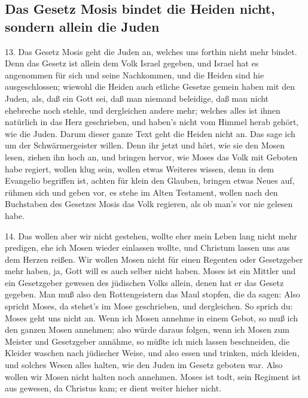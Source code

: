 \subsection[Das Gesetz Mosis bindet die Heiden nicht, sondern]{Das Gesetz Mosis bindet die Heiden nicht, sondern allein die Juden}

13. Das Gesetz Mosis geht die Juden an, welches uns forthin nicht mehr bindet. Denn das Gesetz ist allein dem Volk Israel gegeben, und Israel hat es angenommen für sich und seine Nachkommen, und die Heiden sind hie ausgeschlossen; wiewohl die Heiden auch etliche Gesetze gemein haben mit den Juden, als, daß ein Gott sei, daß man niemand beleidige, daß man nicht ehebreche noch stehle, und dergleichen andere mehr; welches alles ist ihnen natürlich in das Herz geschrieben, und haben’s nicht vom Himmel herab gehört, wie die Juden. Darum dieser ganze Text geht die Heiden nicht an. Das sage ich um der Schwärmergeister willen. Denn ihr jetzt und hört, wie sie den Mosen lesen, ziehen ihn hoch an, und bringen hervor, wie Moses das Volk mit Geboten habe regiert, wollen klug sein, wollen etwas Weiteres wissen, denn in dem Evangelio begriffen ist, achten für klein den Glauben, bringen etwas Neues auf, rühmen sich und geben vor, es stehe im Alten Testament, wollen nach den Buchstaben des Gesetzes Mosis das Volk regieren, als ob man’s vor nie gelesen habe.

14. Das wollen aber wir nicht gestehen, wollte eher mein Leben lang nicht mehr predigen, ehe ich Mosen wieder einlassen wollte, und Christum lassen uns aus dem Herzen reißen. Wir wollen Mosen nicht für einen Regenten oder Gesetzgeber mehr haben, ja, Gott will es auch selber nicht haben. Moses ist ein Mittler und ein Gesetzgeber gewesen des jüdischen Volks allein, denen hat er das Gesetz gegeben. Man muß also den Rottengeistern das Maul stopfen, die da sagen: Also spricht Moses, da stehet’s im Mose geschrieben, und dergleichen. So sprich du: Moses geht uns nicht an. Wenn ich Mosen annehme in einem Gebot, so muß ich den ganzen Mosen annehmen; also würde daraus folgen, wenn ich Mosen zum Meister und Gesetzgeber annähme, so müßte ich mich lassen beschneiden, die Kleider waschen nach jüdischer Weise, und also essen und trinken, mich kleiden, und solches Wesen alles halten, wie den Juden im Gesetz geboten war. Also wollen wir Mosen nicht halten noch annehmen. Moses ist todt, sein Regiment ist aus gewesen, da Christus kam; er dient weiter hieher nicht.

